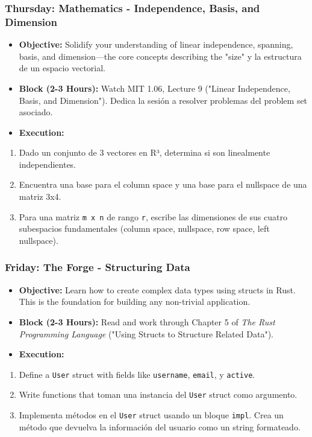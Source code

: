 \documentclass[11pt,a4paper]{report}
\begin{document}
\subsubsection{\textbf{Thursday: Mathematics - Independence, Basis, and Dimension}}
\begin{itemize}
  \item \textbf{Objective:} Solidify your understanding of linear independence, spanning, basis, and dimension—the core concepts describing the "size" y la estructura de un espacio vectorial.
  \item \textbf{Block (2-3 Hours):} Watch MIT 1.06, Lecture 9 ("Linear Independence, Basis, and Dimension"). Dedica la sesión a resolver problemas del problem set asociado.
  \item \textbf{Execution:}
\end{itemize}
\begin{enumerate}
  \item Dado un conjunto de 3 vectores en R³, determina si son linealmente independientes.
  \item Encuentra una base para el column space y una base para el nullspace de una matriz 3x4.
  \item Para una matriz \texttt{m x n} de rango \texttt{r}, escribe las dimensiones de sus cuatro subespacios fundamentales (column space, nullspace, row space, left nullspace).

\end{enumerate}
\subsubsection{\textbf{Friday: The Forge - Structuring Data}}
\begin{itemize}
  \item \textbf{Objective:} Learn how to create complex data types using structs in Rust. This is the foundation for building any non-trivial application.
  \item \textbf{Block (2-3 Hours):} Read and work through Chapter 5 of \textit{The Rust Programming Language} ("Using Structs to Structure Related Data").
  \item \textbf{Execution:}
\end{itemize}
\begin{enumerate}
  \item Define a \texttt{User} struct with fields like \texttt{username}, \texttt{email}, y \texttt{active}.
  \item Write functions that toman una instancia del \texttt{User} struct como argumento.
  \item Implementa métodos en el \texttt{User} struct usando un bloque \texttt{impl}. Crea un método que devuelva la información del usuario como un string formateado.

\end{enumerate}
\end{document}
